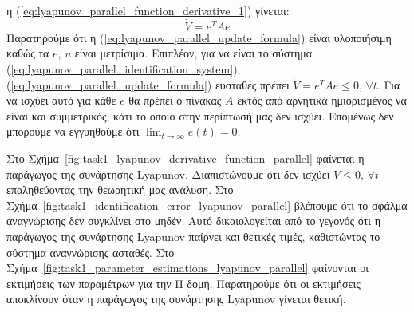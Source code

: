 \documentclass[a4paper,12pt]{article}
\begin{document}
η (\ref{eq:lyapunov_parallel_function_derivative_1}) γίνεται:
\begin{equation}
    \dot{V} = e^TAe
    \label{eq:lyapunov_parallel_function_derivative_2}
\end{equation}
Παρατηρούμε ότι η (\ref{eq:lyapunov_parallel_update_formula}) είναι υλοποιήσιμη καθώς τα $e$, $u$ είναι 
μετρίσιμα. Επιπλέον, για να είναι το σύστημα (\ref{eq:lyapunov_parallel_identification_system}),
(\ref{eq:lyapunov_parallel_update_formula}) ευσταθές πρέπει $\dot{V} = e^TAe \leq 0,\, \forall t$. Για να 
ισχύει αυτό για κάθε $e$ θα πρέπει ο πίνακας $A$ εκτός από αρνητικά ημιορισμένος να είναι και συμμετρικός,
κάτι το οποίο στην περίπτωσή μας δεν ισχύει. Επομένως δεν μπορούμε να εγγυηθούμε ότι 
$\lim_{t \to \infty}e(t) = 0$.

Στο Σχήμα~\ref{fig:task1_lyapunov_derivative_function_parallel} φαίνεται η παράγωγος της συνάρτησης 
Lyapunov. Διαπιστώνουμε ότι δεν ισχύει 
$\dot{V} \leq 0, \, \forall t$ επαληθεύοντας την θεωρητική μας ανάλυση.
Στο Σχήμα~\ref{fig:task1_identification_error_lyapunov_parallel} βλέπουμε ότι το σφάλμα αναγνώρισης
δεν συγκλίνει στο μηδέν. Αυτό δικαιολογείται από το γεγονός ότι η παράγωγος της συνάρτησης 
Lyapunov παίρνει και θετικές τιμές, καθιστώντας το σύστημα
αναγνώρισης ασταθές.
Στο Σχήμα~\ref{fig:task1_parameter_estimations_lyapunov_parallel} φαίνονται οι εκτιμήσεις των παραμέτρων
για την Π δομή. Παρατηρούμε ότι οι εκτιμήσεις αποκλίνουν όταν η παράγωγος της συνάρτησης
Lyapunov γίνεται θετική.
\end{document}
